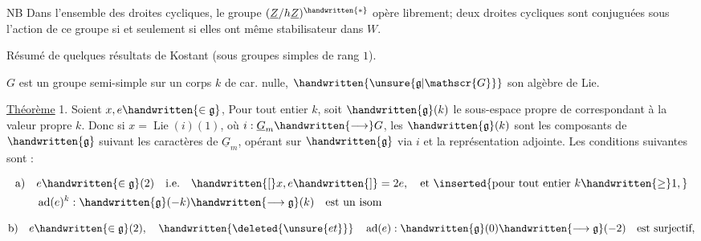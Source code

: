 NB Dans l'ensemble des droites cycliques, le groupe $(\underline{Z}/h\underline{Z})^{\handwritten{*}}$ opère librement; deux droites cycliques sont conjuguées sous l'action de ce groupe si et seulement si elles ont même stabilisateur dans $W$.

Résumé de quelques résultats de Kostant (sous groupes simples de rang $1$).

$G$ est un groupe semi-simple sur un corps $k$ de car. nulle, $\handwritten{\unsure{\mathfrak{g}|\mathscr{G}}}$ son algèbre de Lie.

\uline{Théorème} 1.  Soient $x,e\handwritten{\in\mathfrak{g}}$, Pour tout entier $k$, soit $\handwritten{\mathfrak{g}}(k)$ le sous-espace propre de\hspace{1.5em} correspondant à la valeur propre $k$. Donc si $x=\operatorname{Lie}(i)(1)$, où $i:\underline{G}_m\handwritten{\longrightarrow}G$, les $\handwritten{\mathfrak{g}}(k)$ sont les  composants de $\handwritten{\mathfrak{g}}$ suivant les caractères de $\underline{G}_m$, opérant sur $\handwritten{\mathfrak{g}}$ via $i$ et la représentation adjointe. Les conditions suivantes sont :

\[
\begin{aligned}
\text{a)}\quad &e\handwritten{\in\mathfrak{g}}(2)\quad\text{i.e.}\quad \handwritten{[}x,e\handwritten{]}=2e,\quad\text{et }\inserted{\text{pour tout entier }k\handwritten{\geq}1,}\\
&\operatorname{ad}(e)^k:\handwritten{\mathfrak{g}}(-k)\handwritten{\longrightarrow\mathfrak{g}}(k)\quad\text{est un isom}
\end{aligned}
\]

\[
\text{b)}\quad e\handwritten{\in\mathfrak{g}}(2),\quad\handwritten{\deleted{\unsure{et}}}\quad \operatorname{ad}(e):\handwritten{\mathfrak{g}}(0)\handwritten{\longrightarrow\mathfrak{g}}(-2)\quad\text{est surjectif},
\]


